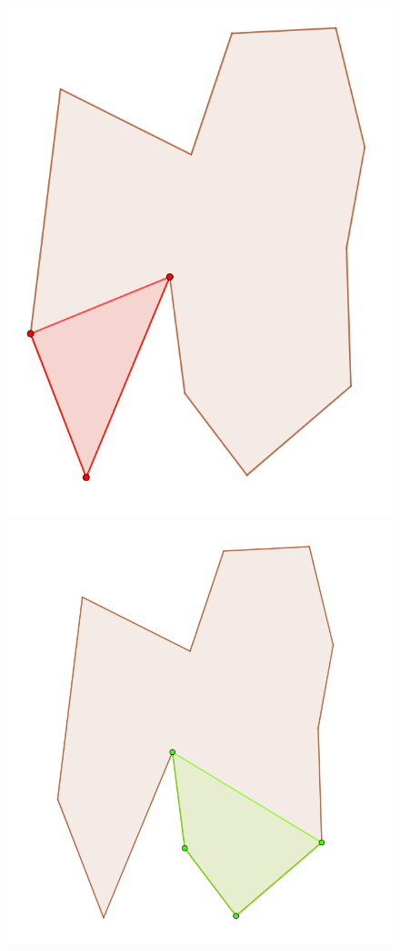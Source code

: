 \documentclass[12pt]{article}
\begin{document}
\begin{figure}[H]
  \includegraphics[width=\linewidth]{Images/intersection_yMonotoneSection1.png}
  \caption{}
  \label{fig:intersectionPolygonSection1}
\endminipage\hfill
{}
  \includegraphics[width=\linewidth]{Images/intersection_yMonotoneSection2.png}

\end{figure}
\end{document}
